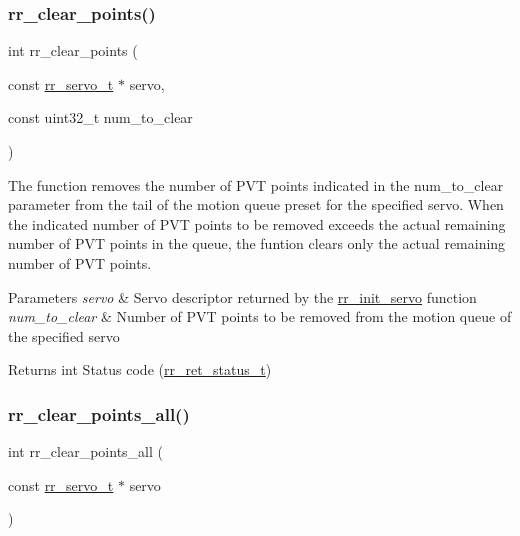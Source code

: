\subsubsection{\texorpdfstring{rr\+\_\+clear\+\_\+points()}{rr\_clear\_points()}}
{\footnotesize\ttfamily int rr\+\_\+clear\+\_\+points (\begin{DoxyParamCaption}\item[{const \hyperlink{structrr__servo__t}{rr\+\_\+servo\+\_\+t} $\ast$}]{servo,  }\item[{const uint32\+\_\+t}]{num\+\_\+to\+\_\+clear }\end{DoxyParamCaption})}



The function removes the number of P\+VT points indicated in the \textquotesingle{}num\+\_\+to\+\_\+clear\textquotesingle{} parameter from the tail of the motion queue preset for the specified servo. When the indicated number of P\+VT points to be removed exceeds the actual remaining number of P\+VT points in the queue, the funtion clears only the actual remaining number of P\+VT points. 


\begin{DoxyParams}{Parameters}
{\em servo} & Servo descriptor returned by the \hyperlink{group___init_ga0adb313a3eeb8a4399431e940a1f3e9e}{rr\+\_\+init\+\_\+servo} function \\
\hline
{\em num\+\_\+to\+\_\+clear} & Number of P\+VT points to be removed from the motion queue of the specified servo \\
\hline
\end{DoxyParams}
\begin{DoxyReturn}{Returns}
int Status code (\hyperlink{api_8h_a92d5be5038abcf89837faf85a08debdc}{rr\+\_\+ret\+\_\+status\+\_\+t}) 
\end{DoxyReturn}
\mbox{\label{group___trajectory_ga19472cd90ae91f9b9f49edf4f52f35a2}} 
\subsubsection{\texorpdfstring{rr\+\_\+clear\+\_\+points\+\_\+all()}{rr\_clear\_points\_all()}}
{\footnotesize\ttfamily int rr\+\_\+clear\+\_\+points\+\_\+all (\begin{DoxyParamCaption}\item[{const \hyperlink{structrr__servo__t}{rr\+\_\+servo\+\_\+t} $\ast$}]{servo }\end{DoxyParamCaption})}



